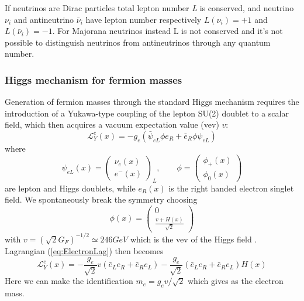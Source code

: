 \documentclass{subnucbo}
\begin{document}
If neutrinos are Dirac particles total lepton number \emph{L} is conserved, and neutrino $\nu_i$ and antineutrino $\bar{\nu}_i$ have lepton number respectively  $L(\nu_i)=+1$ and $L(\bar{\nu}_i)=-1$.
For Majorana neutrinos instead L is not conserved and it's not possible to distinguish neutrinos from antineutrinos through any quantum number.

\subsubsection{Higgs mechanism for fermion masses}
Generation of fermion masses through the standard Higgs mechanism requires the introduction of a Yukawa-type coupling of the lepton SU(2) doublet to a scalar field, which then acquires a vacuum expectation value (vev) $v$: 
\begin{equation}
\label{eq:ElectronLag}
\mathcal{L}_Y^e(x)=-g_e(\bar{\psi}_{eL}\phi e_R+\bar{e}_R\phi \psi_{eL}) 
\end{equation}
where
\begin{equation}
\psi_{eL}(x)=\begin{pmatrix}\nu_{e}(x)\\ e^-(x) \end{pmatrix}_L,\qquad
\phi=\begin{pmatrix}\phi_+(x)\\ \phi_0(x) \end{pmatrix}
\end{equation}
are lepton and Higgs doublets, while $e_R(x)$ is the right handed electron singlet field.
We spontaneously break the symmetry choosing 
\begin{equation}
\phi(x)=\begin{pmatrix}0\\ \frac{v+H(x)}{\sqrt{2}}\end{pmatrix}
\end{equation}
with $v=(\sqrt{2}G_F)^{-1/2}\simeq246GeV$ which is the vev of the Higgs field \cite{ref:Halzen}.
Lagrangian (\ref{eq:ElectronLag}) then becomes
\begin{equation}
\mathcal{L}_Y^e(x)=-\frac{g_e}{\sqrt{2}}v(\bar{e}_Le_R+\bar{e}_Re_L)-\frac{g_e}{\sqrt{2}}(\bar{e}_Le_R+\bar{e}_Re_L)H(x)
\end{equation}
Here we can make the identification $m_e=g_ev/\sqrt{2}$ which gives as the electron mass.
\end{document}
